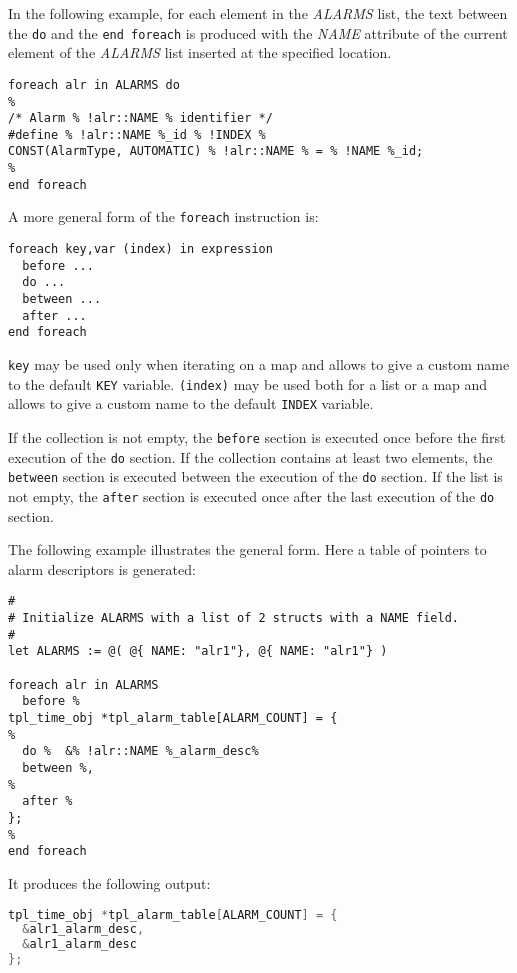 \documentclass[11pt]{article}
\newcommand{\var}[1]{{\ttfamily\em #1}}
\begin{document}
In the following example, for each element in the \var{ALARMS} list, the text between the {\tt do} and the {\tt end foreach} is produced with the \var{NAME} attribute of the current element of the \var{ALARMS} list inserted at the specified location.

\begin{lstlisting}
foreach alr in ALARMS do
%
/* Alarm % !alr::NAME % identifier */
#define % !alr::NAME %_id % !INDEX %
CONST(AlarmType, AUTOMATIC) % !alr::NAME % = % !NAME %_id;
%
end foreach
\end{lstlisting}

A more general form of the {\tt foreach} instruction is:

\begin{lstlisting}
foreach key,var (index) in expression
  before ...
  do ...
  between ...
  after ...
end foreach
\end{lstlisting}

\texttt{key} may be used only when iterating on a map and allows to give a custom name to the default {\tt KEY} variable. \texttt{(index)} may be used both for a list or a map and allows to give a custom name to the default {\tt INDEX} variable.

If the collection is not empty, the {\tt before} section is executed once before the first execution of the {\tt do} section. If the collection contains at least two elements, the {\tt between} section is executed between the execution of the {\tt do} section.  If the list is not empty, the {\tt after} section is executed once after the last execution of the {\tt do} section.

The following example illustrates the general form. Here a table of pointers to alarm descriptors is generated:

\begin{lstlisting}
#
# Initialize ALARMS with a list of 2 structs with a NAME field.
#
let ALARMS := @( @{ NAME: "alr1"}, @{ NAME: "alr1"} )

foreach alr in ALARMS
  before %
tpl_time_obj *tpl_alarm_table[ALARM_COUNT] = {
%
  do %  &% !alr::NAME %_alarm_desc%
  between %,
%
  after %
};
%
end foreach
\end{lstlisting}

It produces the following output:

\begin{lstlisting}[language=C]
tpl_time_obj *tpl_alarm_table[ALARM_COUNT] = {
  &alr1_alarm_desc,
  &alr1_alarm_desc
};
\end{lstlisting}
\end{document}
